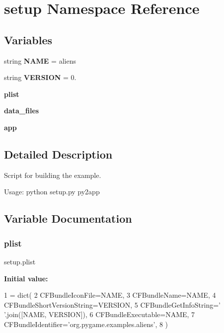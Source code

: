 \hypertarget{namespacesetup}{}\section{setup Namespace Reference}
\label{namespacesetup}
\subsection*{Variables}
\begin{DoxyCompactItemize}
\item 
\mbox{\label{namespacesetup_a8a38282b23206ebafccde8f4de986718}} 
string {\bfseries N\+A\+ME} = \textquotesingle{}aliens\textquotesingle{}
\item 
\mbox{\label{namespacesetup_a704f2323949f9be057e0a3574731e019}} 
string {\bfseries V\+E\+R\+S\+I\+ON} = \textquotesingle{}0.\textquotesingle{}
\item 
{\bfseries plist}
\item 
\mbox{\label{namespacesetup_ad027a8e9452da003dca32bf7467bd16e}} 
{\bfseries data\+\_\+files}
\item 
\mbox{\label{namespacesetup_aad9151216e694c416c968e9eecaec02a}} 
{\bfseries app}
\end{DoxyCompactItemize}


\subsection{Detailed Description}
\begin{DoxyVerb}Script for building the example.

Usage:
    python setup.py py2app
\end{DoxyVerb}
 

\subsection{Variable Documentation}
\mbox{\label{namespacesetup_adcba0ccec227e8f14fcbfc3ae9bfe7d6}} 
\subsubsection{\texorpdfstring{plist}{plist}}
{\footnotesize\ttfamily setup.\+plist}

{\bfseries Initial value\+:}
\begin{DoxyCode}
1 =  dict(
2     CFBundleIconFile=NAME,
3     CFBundleName=NAME,
4     CFBundleShortVersionString=VERSION,
5     CFBundleGetInfoString=\textcolor{stringliteral}{' '}.join([NAME, VERSION]),
6     CFBundleExecutable=NAME,
7     CFBundleIdentifier=\textcolor{stringliteral}{'org.pygame.examples.aliens'},
8 )
\end{DoxyCode}
